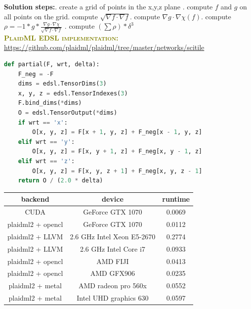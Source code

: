 \documentclass[9pt,twocolumn,twoside,notitlepage]{article}
\begin{document}
\textbf{Solution steps:}. create a grid of points in the x,y,z plane . compute $f$ and $g$ on all points on the grid. compute $\sqrt{\nabla f \cdot \nabla f}$. compute $\nabla g \cdot \nabla \chi (f)$. compute $\rho = -1 * g * \frac{\nabla g \cdot \nabla 
\chi}{\sqrt{\nabla f \cdot \nabla f}}$ . compute $(\sum \rho)*\delta^3$\newline
\\[4in]
{\normalfont\sffamily\bfseries\scshape\fontsize{12}{14}\selectfont \textcolor{olive} {PlaidML EDSL implementation:}}\newline
\hyperlink{https://github.com/plaidml/plaidml/tree/master/networks/scitile}{https://github.com/plaidml/plaidml/tree/master/networks/scitile}
\begin{lstlisting}[language=Python, caption= EDSL Sample Code]
def partial(F, wrt, delta):
    F_neg = -F
    dims = edsl.TensorDims(3)
    x, y, z = edsl.TensorIndexes(3)
    F.bind_dims(*dims)
    O = edsl.TensorOutput(*dims)
    if wrt == 'x':
        O[x, y, z] = F[x + 1, y, z] + F_neg[x - 1, y, z]
    elif wrt == 'y':
        O[x, y, z] = F[x, y + 1, z] + F_neg[x, y - 1, z]
    elif wrt == 'z':
        O[x, y, z] = F[x, y, z + 1] + F_neg[x, y, z - 1]
    return O / (2.0 * delta)
\end{lstlisting}
\begin{table}[htbp]
\centering
\begin{tabular}{ccc}
\hline
backend & device & runtime \\
\hline
CUDA  & GeForce GTX 1070  & 0.0069 \\
plaidml2 + opencl & GeForce GTX 1070 & 0.0112 \\
plaidml2 + LLVM  & 2.6 GHz Intel Xeon E5-2670 & 0.2774 \\
plaidml2 + LLVM  &  2.6 GHz Intel Core i7 & 0.0933\\
plaidml2 + opencl & AMD FIJI & 0.0413 \\
plaidml2 + opencl & AMD GFX906 & 0.0235\\
plaidml2 + metal & AMD radeon pro 560x & 0.0552 \\
plaidml2 + metal &  Intel UHD graphics 630 & 0.0597 \\
\hline
\end{tabular}
  \label{tab:shapefunctions}
\end{table}
\end{document}
